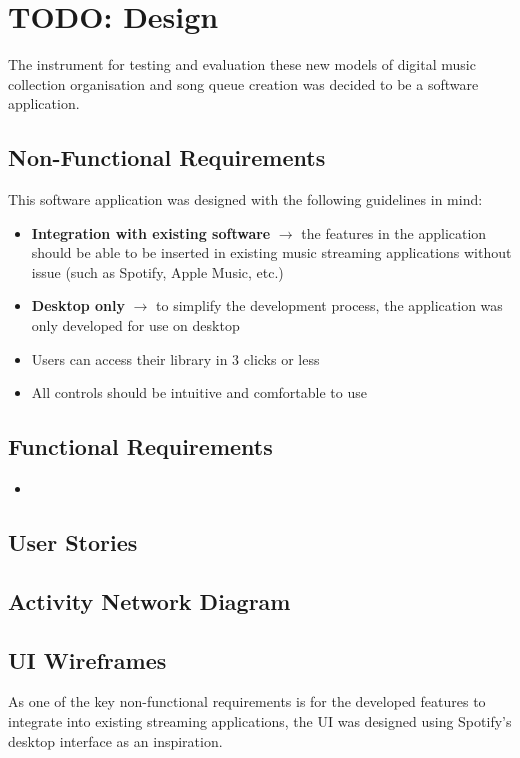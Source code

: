 \chapter{TODO: Design}

The instrument for testing and evaluation these new models of digital music collection organisation and song queue creation was decided to be a software application.

\section{Non-Functional Requirements}
This software application was designed with the following guidelines in mind:\begin{itemize}
    \item \textbf{
        Integration with existing software
    } \(\to\) the features in the application should be able to be inserted in existing music streaming applications without issue (such as Spotify, Apple Music, etc.) %
    \item \textbf{
        Desktop only
    } \(\to\) to simplify the development process, the application was only developed for use on desktop
    \item Users can access their library in 3 clicks or less %
    \item All controls should be intuitive and comfortable to use
\end{itemize} %

\section{Functional Requirements}
\begin{itemize}
    \item 
\end{itemize}

\section{User Stories}

\section{Activity Network Diagram} %

\section{UI Wireframes}%
As one of the key non-functional requirements is for the developed features to integrate into existing streaming applications, the UI was designed using Spotify's desktop interface as an inspiration.